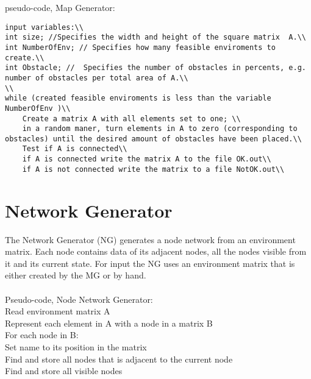 pseudo-code, Map Generator:\\
\begin{verbatim}
input variables:\\
int size; //Specifies the width and height of the square matrix  A.\\
int NumberOfEnv; // Specifies how many feasible enviroments to create.\\
int Obstacle; //  Specifies the number of obstacles in percents, e.g. number of obstacles per total area of A.\\
\\
while (created feasible enviroments is less than the variable NumberOfEnv )\\
	Create a matrix A with all elements set to one; \\
	in a random maner, turn elements in A to zero (corresponding to obstacles) until the desired amount of obstacles have been placed.\\
	Test if A is connected\\
	if A is connected write the matrix A to the file OK.out\\
	if A is not connected write the matrix to a file NotOK.out\\
\end{verbatim}

\section{Network Generator}
The Network Generator (NG) generates a node network from an environment matrix. Each node contains data of its adjacent nodes, all the nodes visible from it and its current state. For input the NG uses an environment matrix that is either created by the MG or by hand.\\
\\
\noindent Pseudo-code, Node Network Generator:\\
\indent Read environment matrix A\\
\indent Represent each element in A with a node in a matrix B\\
\indent For each node in B:\\
\indent \indent Set name to its position in the matrix\\
\indent \indent Find and store all nodes that is adjacent to the current node\\
\indent \indent Find and store all visible nodes
